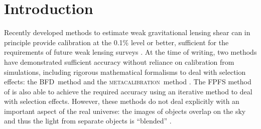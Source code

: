 \documentclass[iop, twocolappendix, appendixfloats, numberedappendix, apj]{hackemulateapj}
\newcommand{\mcal}{\textsc{metacalibration}}
\newcommand{\mdet}{\textsc{metadetection}}
\newcommand{\Mcal}{\textsc{Metacalibration}}
\newcommand{\bfd}{\textsc{BFD}}
\begin{document}
\begin{abstract}
\end{abstract}

\section{Introduction} \label{sec:intro}

Recently developed methods to estimate weak gravitational lensing shear can in
principle provide calibration at the 0.1\% level or better, sufficient for the
requirements of future weak lensing surveys \citep[e.g.,][]{huterer2006}.  At
the time of writing, two methods have demonstrated sufficient accuracy without
reliance on calibration from simulations, including rigorous mathematical
formalisms to deal with selection effects:  the \bfd\ method
\citep{BernBFD2016} and the \mcal\ method \citep{HuffMcal2017,SheldonMcal2017}.
The FPFS method of \cite{FPFS2018} is also able to achieve the required
accuracy using an iterative method to deal with selection effects.  However,
these methods do not deal explicitly with an important aspect of the real
universe: the images of objects overlap on the sky and thus the light from
separate objects is ``blended'' \citep[for discussion of blending
effects see, e.g.,][]{DawsonBlending2016}.
\end{document}
